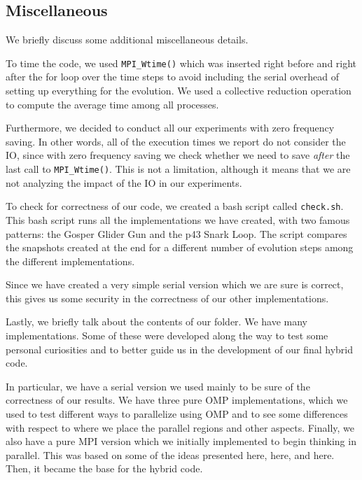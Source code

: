 \documentclass{report}
\begin{document}
\subsection{Miscellaneous}

We briefly discuss some additional miscellaneous details. 

To time the code, we used \texttt{MPI\_Wtime()} which was inserted right 
before and right after the for loop over the time steps to avoid including the 
serial overhead of setting up everything for the evolution. We used a collective reduction 
operation to compute the average time among all processes. 

Furthermore, we decided to conduct all our experiments with zero frequency saving. 
In other words, all of the execution times we report do not consider the IO, since 
with zero frequency saving we check whether we need to save \textit{after}
the last call to \texttt{MPI\_Wtime()}. This is not a limitation, 
although it means that we are not analyzing the impact of the IO in our experiments.

To check for correctness of our code, we created a bash script called 
\texttt{check.sh}. This bash script runs all the implementations we have created, 
with two famous patterns: the Gosper Glider Gun\cite{glidergun} and the
p43 Snark Loop\cite{snarkloop}. The script compares the snapshots created at 
the end for a different number of evolution steps among the different implementations. 

Since we have created a very simple serial version which we are sure is correct, 
this gives us some security in the correctness of our other implementations. 

Lastly, we briefly talk about the contents of our folder. We have many implementations.
Some of these were developed along the way to test some personal curiosities and 
to better guide us in the development of our final hybrid code. 

In particular, we have a serial version we used mainly to be sure of the correctness 
of our results. We have three pure OMP implementations, which we used to test 
different ways to parallelize using OMP and to see some differences with respect 
to where we place the parallel regions and other aspects. Finally, we also have a 
pure MPI version which we initially implemented to begin thinking in parallel. This 
was based on some of the ideas presented here\cite{MPIIOtalk}, here\cite{conway_implementation}, 
and here\cite{conway_slides}. Then, it became the base for the hybrid code. 
\end{document}
